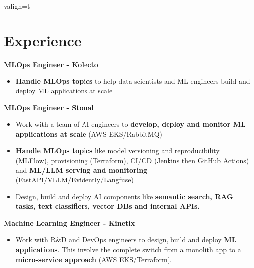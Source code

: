 \documentclass[a4paper,10pt]{article}
\begin{document}
\begin{adjustbox}{valign=t}
    \begin{minipage}{0.6\textwidth}
        \vspace{.5cm}
        \section*{Experience}
        \begin{description}
            \raggedright
            \item[\normalfont \textcolor{ColorOne}{Since Aug. 2025}]
                \textbf{MLOps Engineer - Kolecto}\\
                \small
                \begin{itemize}[topsep=0pt]
                    \item \textbf{Handle MLOps topics} to help data scientists and ML engineers build and deploy ML applications at scale
                \end{itemize}
                \normalsize
            \item[\normalfont \textcolor{ColorOne}{Jan. 2024 -- Jul. 2025}]
                \textbf{MLOps Engineer - Stonal}\\
                \small
                \begin{itemize}[topsep=0pt]
                    \item Work with a team of AI engineers to \textbf{develop, deploy and monitor ML applications at scale} (AWS EKS/RabbitMQ)
                    \item \textbf{Handle MLOps topics} like model versioning and reproducibility (MLFlow), provisioning (Terraform), CI/CD (Jenkins then GitHub Actions) and \textbf{ML/LLM serving and monitoring} (FastAPI/VLLM/Evidently/Langfuse)
                    \item Design, build and deploy AI components like \textbf{semantic search, RAG tasks, text classifiers, vector DBs and internal APIs.}
                \end{itemize}
                \normalsize
            \item[\normalfont \textcolor{ColorOne}{Oct. 2022 -- Dec. 2023}]
                \textbf{Machine Learning Engineer - Kinetix}\\
                \small
                \begin{itemize}[topsep=0pt]
                    \item Work with R\&D and DevOps engineers to design, build and deploy \textbf{ML applications}. This involve the complete switch from a monolith app to a \textbf{micro-service approach} (AWS EKS/Terraform).

\end{itemize}
\end{description}
\end{minipage}
\end{adjustbox}
\end{document}
